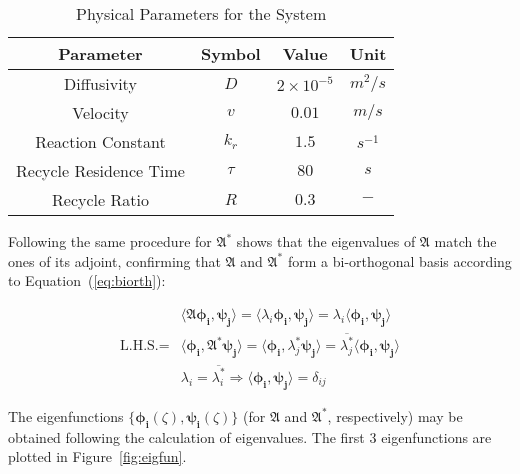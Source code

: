 \begin{table}[ht]
    \centering
    \caption{Physical Parameters for the System}
    \label{tab:pars}
    \begin{tabular}{|c|c|c|c|}
    \hline
    \textbf{Parameter}        & \textbf{Symbol} & \textbf{Value}     & \textbf{Unit}    \\ \hline
    Diffusivity               & $D$             & $2\times10^{-5}$   & ${m^2}/{s}$      \\ \hline
    Velocity                  & $v$             & $0.01$   & ${m}/{s}$        \\ \hline
    Reaction Constant         & $k_r$           & $1.5$              & $s^{-1}$         \\ \hline
    Recycle Residence Time    & $\tau$          & $80$               & $s$              \\ \hline
    Recycle Ratio             & $R$             & $0.3$              & $-$              \\ \hline
    \end{tabular}
\end{table}

Following the same procedure for $\mathfrak{A}^*$ shows that the eigenvalues of $\mathfrak{A}$ match the ones of its adjoint, confirming that $\mathfrak{A}$ and $\mathfrak{A}^*$ form a bi-orthogonal basis according to Equation~(\ref{eq:biorth}):

\begin{equation} \label{eq:biorth}
    \begin{aligned}
        &\langle \mathfrak{A} \bm{\phi_i}, \bm{\psi_j} \rangle = \langle \lambda_i \bm{\phi_i}, \bm{\psi_j} \rangle = \lambda_i \langle \bm{\phi_i}, \bm{\psi_j} \rangle \\
        \text{L.H.S.} = &\langle \bm{\phi_i}, \mathfrak{A}^* \bm{\psi_j} \rangle = \langle \bm{\phi_i}, \lambda_j^* \bm{\psi_j} \rangle = \overline{\lambda_j^*} \langle \bm{\phi_i}, \bm{\psi_j} \rangle \\
        &\lambda_i = \overline{\lambda_i^*} \Rightarrow \langle \bm{\phi_i}, \bm{\psi_j} \rangle = \delta_{ij}
    \end{aligned}
\end{equation}

The eigenfunctions $\{ \bm{\phi_i}(\zeta), \bm{\psi_i}(\zeta) \}$ (for $\mathfrak{A}$ and $\mathfrak{A}^*$, respectively) may be obtained following the calculation of eigenvalues. The first 3 eigenfunctions are plotted in Figure~\ref{fig:eigfun}. 
